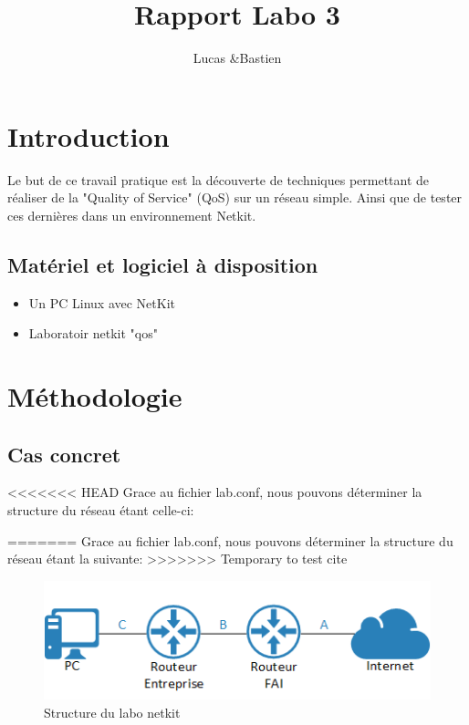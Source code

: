 \documentclass{article}
\title{Rapport Labo 3}
\author{Lucas \bsc{Bulloni} \&Bastien \bsc{Wermeille}}
\begin{document}
\maketitle

 

\section{Introduction}
 Le but de ce travail pratique est la découverte de techniques permettant de réaliser de la "Quality of Service" (QoS) sur un réseau simple. Ainsi que de tester ces dernières dans un environnement Netkit.

\subsection{Matériel et logiciel à disposition}
\begin{itemize}
	\item Un PC Linux avec NetKit
	\item Laboratoir netkit "qos"
\end{itemize}

\section{Méthodologie}

\subsection{Cas concret}
<<<<<<< HEAD
Grace au fichier lab.conf, nous pouvons déterminer la structure du réseau étant celle-ci:

=======
Grace au fichier lab.conf, nous pouvons déterminer la structure du réseau étant la suivante:
>>>>>>> Temporary to test cite
\begin{figure}[h]
  \centering
  \includegraphics{./Structure.png}
  \caption{Structure du labo netkit}
  \label{fig:structure}
\end{figure}
\end{document}

